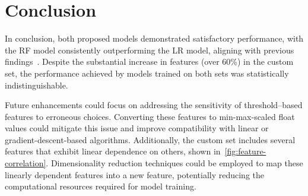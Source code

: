 \section{Conclusion}\label{sec:conclusion}
In conclusion, both proposed models demonstrated satisfactory performance,
with the RF model consistently outperforming the LR model, aligning with
previous findings~\cite{CHIEW2019153, SAHINGOZ2019345}. Despite the substantial
increase in features (over 60\%) in the custom set, the performance achieved
by models trained on both sets was statistically indistinguishable.

Future enhancements could focus on addressing the sensitivity of threshold--based
features to erroneous choices. Converting these features to min-max-scaled float
values could mitigate this issue and improve compatibility with linear or
gradient-descent-based algorithms. Additionally, the custom set includes
several features that exhibit linear dependence on others, shown in~\autoref{fig:feature-correlation}.
Dimensionality reduction techniques could be employed to map these linearly dependent features
into a new feature, potentially reducing the computational resources required
for model training.
